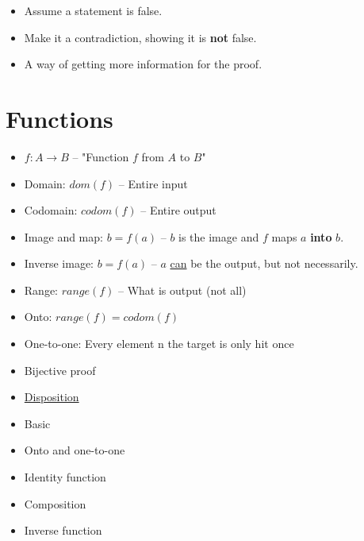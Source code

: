 \documentclass[english,10pt,a4paper]{article}
\begin{document}
\begin{theo} 
\begin{itemize}
\item Assume a statement is false.
\item Make it a contradiction, showing it is \textbf{not} false.
\item A way of getting more information for the proof.
\end{itemize}
\end{theo}



\newpage
\section{Functions}

\begin{minipage}{0.7\linewidth}
\begin{theo}[Basic] 
\begin{itemize}
\item $f: A \rightarrow B$ -- "Function $f$ from $A$ to $B$"
\item Domain: $dom(f)$ -- Entire input
\item Codomain: $codom(f)$ -- Entire output
\item Image and map: $b=f(a)$ -- $b$ is the image and $f$ maps $a$ \textbf{into} $b$.
\item Inverse image: $b=f(a)$ -- $a$ \underline{can} be the output, but not necessarily.
\item Range: $range(f)$ -- What is output (not all)
\item Onto: $range(f) = codom(f)$
\item One-to-one: Every element n the target is only hit
 once
\item Bijective proof
\end{itemize}
\end{theo}
\end{minipage}
\hspace{0.1cm}
\begin{minipage}{0.25\linewidth}
\begin{itemize}
\item \underline{Disposition}
\item Basic
\item Onto and one-to-one
\item Identity function
\item Composition
\item Inverse function
\end{itemize}
\end{minipage}
\end{document}
